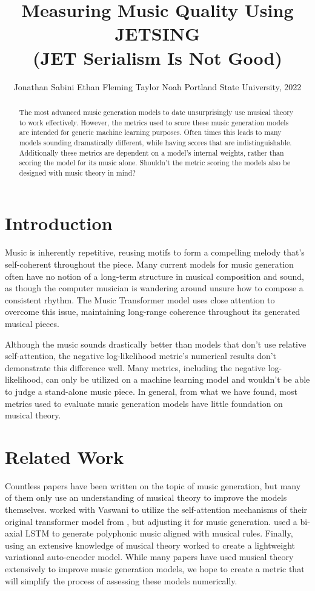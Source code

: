 \documentclass[11pt]{article}
\title{Measuring Music Quality Using JETSING \\ (JET Serialism Is Not Good) }
\author{Jonathan Sabini \And Ethan Fleming \And Taylor Noah 
\AND
Portland State University, 2022}
\begin{document}
\maketitle

\begin{abstract}
    The most advanced music generation models to date unsurprisingly use musical theory to work effectively.
    However, the metrics used to score these music generation models are intended for generic machine learning purposes.
    Often times this leads to many models sounding dramatically different, while having scores that are indistinguishable.
    Additionally these metrics are dependent on a model's internal weights, rather than scoring the model for its music alone.
    Shouldn't the metric scoring the models also be designed with music theory in mind?
\end{abstract}

\section{Introduction}
Music is inherently repetitive, reusing motifs to form a compelling melody that's self-coherent throughout the piece.
Many current models for music generation often have no notion of a long-term structure in musical composition and sound,
as though the computer musician is wandering around unsure how to compose a consistent rhythm.
The Music Transformer model \citep{huang2018music} uses close attention to overcome this issue,
maintaining long-range coherence throughout its generated musical pieces.

Although the music sounds drastically better than models that don't use relative self-attention,
the negative log-likelihood metric's numerical results don't demonstrate this difference well.
Many metrics, including the negative log-likelihood, can only be utilized on a machine learning model and wouldn't be able to judge a stand-alone music piece.
In general, from what we have found, most metrics used to evaluate music generation models have little foundation on musical theory.

\section{Related Work}
Countless papers have been written on the topic of music generation, but many of them only use an understanding of musical theory to improve the models themselves.
\citep{huang2018music} worked with Vaswani to utilize the self-attention mechanisms of their original transformer model from \citep{vaswani2017attention}, but adjusting it for music generation.
\citep{kotecha2018generating} used a bi-axial LSTM to generate polyphonic music aligned with musical rules.
Finally, \citep{zhao2020verticalhorizontal} using an extensive knowledge of musical theory worked to create a lightweight variational auto-encoder model.
While many papers have used musical theory extensively to improve music generation models, we hope to create a metric that will simplify the process of assessing these models numerically.
\end{document}
